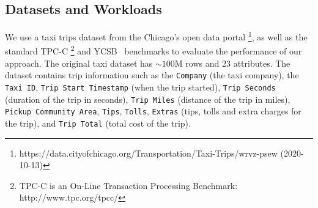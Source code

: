 \subsection{Datasets and Workloads}\label{sec:exp-data-and-workloads}
We use a taxi trips dataset from the Chicago's open data portal \footnote{https://data.cityofchicago.org/Transportation/Taxi-Trips/wrvz-psew (2020-10-13)}, as well as the standard TPC-C \footnote{TPC-C is an On-Line Transaction Processing Benchmark: http://www.tpc.org/tpcc/} and YCSB~\cite{CooperSTRS10} benchmarks to evaluate the performance of our approach. %
The original taxi dataset has $\sim100$M rows and 23 attributes.
The dataset contains trip information such as the \texttt{Company} (the taxi company), the \texttt{Taxi ID}, \texttt{Trip Start Timestamp}
(when the trip started), \texttt{Trip Seconds} (duration of the trip in seconds), \texttt{Trip Miles}
(distance of the trip in miles), \texttt{Pickup Community Area}, \texttt{Tips}, \texttt{Tolls}, \texttt{Extras} (tips, tolls and extra charges for the trip), and \texttt{Trip Total} (total cost of the trip).
%
